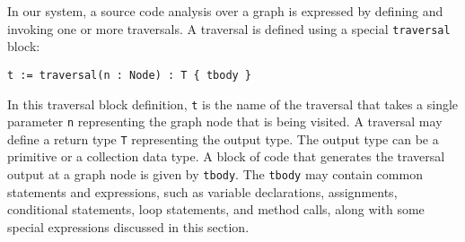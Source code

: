 
In our system, a source code analysis over a graph is expressed by defining and
invoking one or more traversals. A traversal is defined using a special
\lstinline|traversal| block: 
\begin{lstlisting} 
t := traversal(n : Node) : T { tbody }
\end{lstlisting}
In this traversal block definition, \lstinline|t| is the name of the traversal
that takes a single parameter \lstinline|n| representing the graph node that is
being visited. A traversal may define a return type \lstinline|T| representing
the output type. The output type can be a primitive or a collection data type. A
block of code that generates the traversal output at a graph node is given by
\lstinline|tbody|. The \lstinline|tbody| may contain common statements and
expressions, such as variable declarations, assignments, conditional statements,
loop statements, and method calls, along with some special expressions discussed
in this section.
% 
% 
% 
% 

